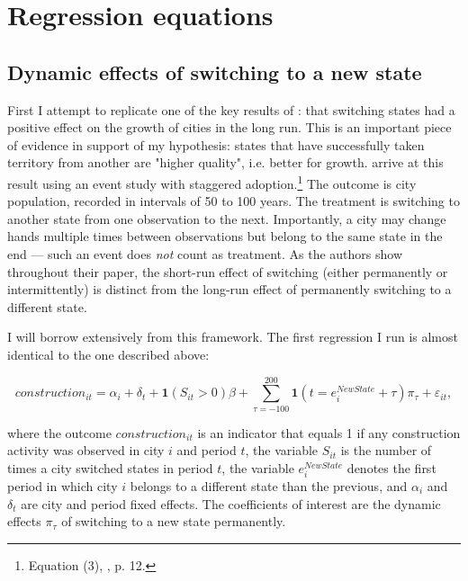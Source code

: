 \documentclass[11pt, a4paper]{article}
\begin{document}

\section{Regression equations} \label{sec:empirics}

\subsection{Dynamic effects of switching to a new state}

First I attempt to replicate one of the key results of \cite{schoenholzer2022}: that switching states had a positive effect on the growth of cities in the long run. This is an important piece of evidence in support of my hypothesis: states that have successfully taken territory from another are "higher quality", i.e. better for growth. \cite{schoenholzer2022} arrive at this result using an event study with staggered adoption.\footnote
{
    Equation (3), \citealp{schoenholzer2022}, p. 12.
}
The outcome is city population, recorded in intervals of 50 to 100 years. The treatment is switching to another state from one observation to the next. Importantly, a city may change hands multiple times between observations but belong to the same state in the end --- such an event does \textit{not} count as treatment. As the authors show throughout their paper, the short-run effect of switching (either permanently or intermittently) is distinct from the long-run effect of permanently switching to a different state.

I will borrow extensively from this framework. The first regression I run is almost identical to the one described above:

\begin{equation}
\label{eq:sw22}
    construction_{it} = \alpha_i + \delta_t + \mathbf{1}(S_{it} > 0)\beta + 
    \sum_{\tau = -100}^{200} \mathbf{1}(t = e^{NewState}_i + \tau)\pi_\tau + \varepsilon_{it},
\end{equation}

where the outcome $construction_{it}$ is an indicator that equals 1 if any construction activity was observed in city $i$ and period $t$, the variable $S_{it}$ is the number of times a city switched states in period $t$, the variable $e^{NewState}_i$ denotes the first period in which city $i$ belongs to a different state than the previous, and $\alpha_i$ and $\delta_t$ are city and period fixed effects. The coefficients of interest are the dynamic effects $\pi_\tau$ of switching to a new state permanently. 
\end{document}
